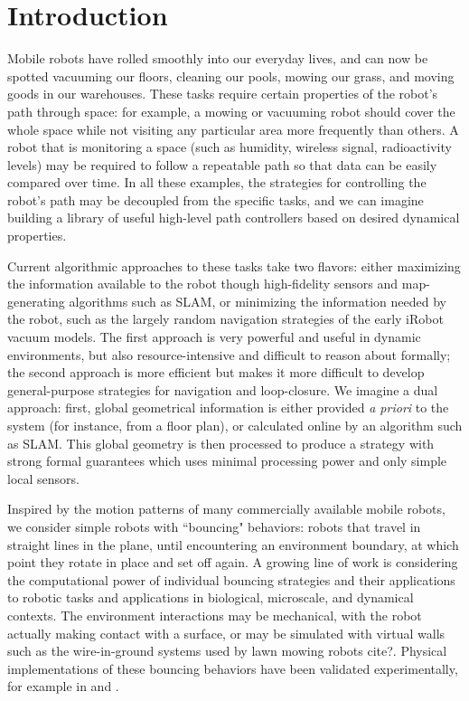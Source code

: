 \documentclass[]{styles/svproc}  %
\begin{document}
\section{Introduction}

Mobile robots have rolled smoothly into our everyday lives, and can now be
spotted vacuuming our floors, cleaning our pools, mowing our grass, and moving
goods in our warehouses. These tasks require certain properties of
the robot's path through space: for example, a mowing or
vacuuming robot should cover the whole space while not visiting 
any particular area more frequently than others. A robot that is monitoring a space 
(such as humidity, wireless signal, radioactivity levels) may be
required to follow a repeatable path so that data can be easily compared 
over time. In all these examples, the strategies for controlling the robot's
path may be decoupled from the specific tasks, and we can imagine building a
library of useful high-level path controllers based on desired dynamical
properties.

Current algorithmic approaches to these tasks take two flavors: either
maximizing the information available to the robot though high-fidelity sensors
and map-generating algorithms such as SLAM, or minimizing the information needed
by the robot, such as the largely random navigation strategies of the early
iRobot vacuum models. The first approach is very powerful and useful in
dynamic environments, but also
resource-intensive and difficult to reason about formally; the second approach 
is more efficient but makes it more difficult to develop general-purpose strategies 
for navigation and loop-closure. We imagine a dual
approach: first, global geometrical information is either provided \emph{a
priori} to the system (for instance, from a floor plan), or calculated online by
an algorithm such as SLAM. This global geometry is then processed to produce
a strategy with strong formal guarantees which uses minimal processing power 
and only simple local sensors.

Inspired by the motion patterns of many commercially available mobile robots, 
we consider simple robots with ``bouncing" behaviors: robots that
travel in straight lines in the plane, until encountering an environment
boundary, at which point they rotate in place and set off again. A growing line
of work is considering the computational power of individual bouncing strategies
and their applications to robotic tasks and applications in biological, microscale, 
and dynamical contexts. The environment interactions may be mechanical,
with the robot actually making contact with a surface, or may be simulated with
virtual walls such as the wire-in-ground systems used by lawn mowing robots
{\color{red} cite?}. Physical implementations of these bouncing behaviors have
been validated experimentally, for example in \cite{LewOKa13} and
\cite{alam2018space}.
\end{document}
